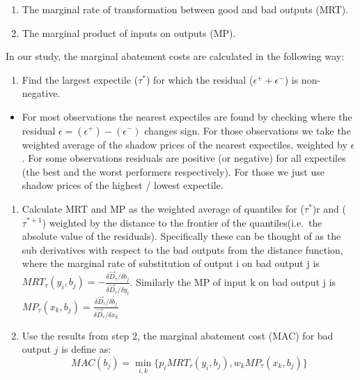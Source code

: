 \documentclass[12pt,]{article}
\providecommand{\tightlist}{%
  \setlength{\itemsep}{0pt}\setlength{\parskip}{0pt}}
\begin{document}
\begin{enumerate}
\def\labelenumi{\arabic{enumi}.}
\tightlist
\item
  The marginal rate of transformation between good and bad outputs (MRT).\\
\item
  The marginal product of inputs on outputs (MP).
\end{enumerate}

In our study, the marginal abatement costs are calculated in the following way:

\begin{enumerate}
\def\labelenumi{\arabic{enumi}.}
\tightlist
\item
  Find the largest expectile (\(\tau^{*}\)) for which the residual (\(\epsilon^+ + \epsilon^-\)) is non-negative.\\
\end{enumerate}

\begin{itemize}
\tightlist
\item
  For most observations the nearest expectiles are found by checking where the residual \(\epsilon = (\epsilon^+) - (\epsilon^-)\) changes sign. For those observations we take the weighted average of the shadow prices of the nearest expectiles, weighted by \(\epsilon\). For some observations residuals are positive (or negative) for all expectiles (the best and the worst performers respectively). For those we just use shadow prices of the highest / lowest expectile.
\end{itemize}

\begin{enumerate}
\def\labelenumi{\arabic{enumi}.}
\setcounter{enumi}{1}
\item
  Calculate MRT and MP as the weighted average of quantiles for (\(\tau^{*}\))r and (\(\tau^{*+1}\)) weighted by the distance to the frontier of the quantiles(i.e.~the absolute value of the residuals). Specifically these can be thought of as the sub derivatives with respect to the bad outputs from the distance function, where the marginal rate of substitution of output i on bad output j is \(MRT_{\tau}(y_{i},b_{j})=-\frac{\delta \vec{D}_{\tau}/\delta b_{j}}{\delta \vec{D}_{\tau}/\delta y_{i}}\). Similarly the MP of input k on bad output j is \(MP_{\tau}(x_{k},b_{j})=\frac{\delta \vec{D}_{\tau}/\delta b_{j}}{\delta \vec{D}_{\tau}/\delta x_{k}}\)
\item
  Use the results from step 2, the marginal abatement cost (MAC) for bad output \(j\) is define as:
  \begin{equation}
  MAC(b_{j})=\displaystyle \min_{i,k}\{p_{i}MRT_{\tau}(y_{i},b_{j}), w_{k}MP_{\tau}(x_{k},b_{j})\}
  \label{eq:mac}
  \end{equation}
\end{enumerate}
\end{document}

